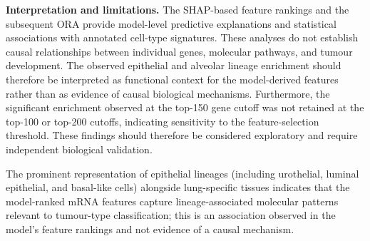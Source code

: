 \textbf{Interpretation and limitations.}
The SHAP-based feature rankings and the subsequent ORA provide model-level
predictive explanations and statistical associations with annotated cell-type
signatures. These analyses do not establish causal relationships between
individual genes, molecular pathways, and tumour development. The observed
epithelial and alveolar lineage enrichment should therefore be interpreted as
functional context for the model-derived features rather than as evidence of
causal biological mechanisms. Furthermore, the significant enrichment observed
at the top-150 gene cutoff was not retained at the top-100 or top-200 cutoffs,
indicating sensitivity to the feature-selection threshold. These findings
should therefore be considered exploratory and require independent biological
validation.


The prominent representation of epithelial lineages (including urothelial,
luminal epithelial, and basal-like cells) alongside lung-specific tissues
indicates that the model-ranked mRNA features capture lineage-associated
molecular patterns relevant to tumour-type classification; this is an
association observed in the model's feature rankings and not evidence of a
causal mechanism.


